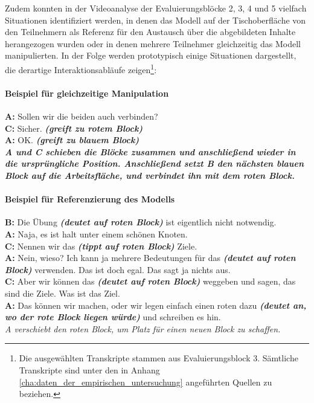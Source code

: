 Zudem konnten in der Videoanalyse der Evaluierungsblöcke 2, 3, 4 und 5 vielfach Situationen identifiziert werden, in denen das Modell auf der Tischoberfläche von den Teilnehmern als Referenz für den Austausch über die abgebildeten Inhalte herangezogen wurden oder in denen mehrere Teilnehmer gleichzeitig das Modell manipulierten. In der Folge werden prototypisch einige Situationen dargestellt, die derartige Interaktionsabläufe zeigen\footnote{Die ausgewählten Transkripte stammen aus Evaluierungsblock 3. Sämtliche Transkripte sind unter den in Anhang \ref{cha:daten_der_empirischen_untersuchung} angeführten Quellen zu beziehen.}:

\paragraph{Beispiel für gleichzeitige Manipulation} %
\begin{transkript}
	\textbf{A:} Sollen wir die beiden auch verbinden? \\
	\textbf{C:} Sicher. \emph{\textbf{(greift zu rotem Block)}} \\
	\textbf{A:} OK. \emph{\textbf{(greift zu blauem Block)}} \\
	\emph{\textbf{A und C schieben die Blöcke zusammen und anschließend wieder in die ursprüngliche Position. Anschließend setzt B den nächsten blauen Block auf die Arbeitsfläche, und verbindet ihn mit dem roten Block.}} \\
\end{transkript}

\paragraph{Beispiel für Referenzierung des Modells} %
\begin{transkript}
	\textbf{B:} Die Übung \emph{\textbf{(deutet auf roten Block)}} ist eigentlich nicht notwendig. \\
	\textbf{A:} Naja, es ist halt unter einem schönen Knoten. \\
	\textbf{C:} Nennen wir das \emph{\textbf{(tippt auf roten Block)}} Ziele. \\
	\textbf{A:} Nein, wieso? Ich kann ja mehrere Bedeutungen für das \emph{\textbf{(deutet auf roten Block)}} verwenden. Das ist doch egal. Das sagt ja nichts aus. \\
	\textbf{C:} Aber wir können das \emph{\textbf{(deutet auf roten Block)}} weggeben und sagen, das sind die Ziele. Was ist das Ziel. \\
	\textbf{A:} Das können wir machen, oder wir legen einfach einen roten dazu \emph{\textbf{(deutet an, wo der rote Block liegen würde)}} und schreiben es hin. \\
	\emph{A verschiebt den roten Block, um Platz für einen neuen Block zu schaffen.} \\
\end{transkript}

